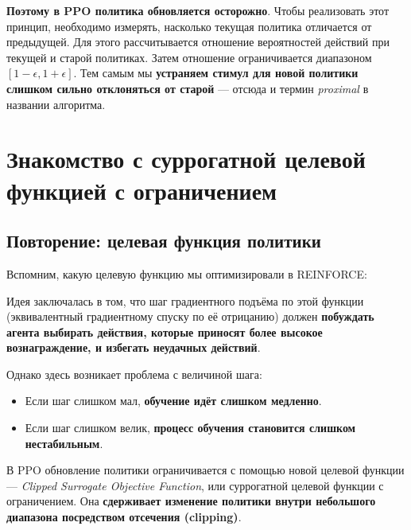 \documentclass[11pt,a4paper]{article}
\begin{document}
\textbf{Поэтому в PPO политика обновляется осторожно}. Чтобы реализовать этот принцип, необходимо измерять, насколько текущая политика отличается от предыдущей. Для этого рассчитывается отношение вероятностей действий при текущей и старой политиках. Затем отношение ограничивается диапазоном \([1 - \epsilon, 1 + \epsilon]\). Тем самым мы \textbf{устраняем стимул для новой политики слишком сильно отклоняться от старой} --- отсюда и термин \emph{proximal} в названии алгоритма.

\section{Знакомство с суррогатной целевой функцией с ограничением}\label{introducing-the-clipped-surrogate-objective-function}

\subsection{Повторение: целевая функция политики}\label{recap-the-policy-objective-function}

Вспомним, какую целевую функцию мы оптимизировали в REINFORCE:


Идея заключалась в том, что шаг градиентного подъёма по этой функции (эквивалентный градиентному спуску по её отрицанию) должен \textbf{побуждать агента выбирать действия, которые приносят более высокое вознаграждение, и избегать неудачных действий}.

Однако здесь возникает проблема с величиной шага:

\begin{itemize}
\tightlist
\item
  Если шаг слишком мал, \textbf{обучение идёт слишком медленно}.
\item
  Если шаг слишком велик, \textbf{процесс обучения становится слишком нестабильным}.
\end{itemize}

В PPO обновление политики ограничивается с помощью новой целевой функции --- \emph{Clipped Surrogate Objective Function}, или суррогатной целевой функции с ограничением. Она \textbf{сдерживает изменение политики внутри небольшого диапазона посредством отсечения (clipping)}.
\end{document}
